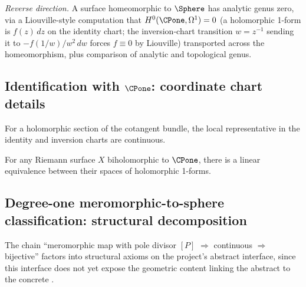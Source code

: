 \begin{formalizationnote}
\emph{Reverse direction.} A surface homeomorphic to \(\Sphere\) has analytic
genus zero, via a Liouville-style computation that
\(H^{0}(\CPone,\Omega^{1})=0\) (a holomorphic 1-form is \(f(z)\,dz\) on the
identity chart; the inversion-chart transition \(w=z^{-1}\) sending it to
\(-f(1/w)/w^{2}\,dw\) forces \(f\equiv0\) by Liouville) transported across the
homeomorphism, plus comparison of analytic and topological genus.
\end{formalizationnote}

\subsection{Identification with \(\CPone\): coordinate chart details}

\begin{lemma}
\label{lem:section-localRepr-continuity}
For a holomorphic section of the cotangent bundle, the local representative in the identity and inversion charts are continuous.
\leanok
\end{lemma}

\begin{theorem}
\label{lem:holomorphic-one-form-linearEquiv-to-OnePointCx}
For any Riemann surface \(X\) biholomorphic to \(\CPone\), there is a linear equivalence between their spaces of holomorphic 1-forms.
\leanok
\end{theorem}

\subsection{Degree-one meromorphic-to-sphere classification: structural decomposition}
\label{sec:degree-one-mer-decomp}

The chain ``meromorphic map with pole divisor \([P]\) \(\Rightarrow\)
continuous \(\Rightarrow\) bijective'' factors into structural axioms
on the project's abstract  interface,
since this interface does not yet expose the geometric content
linking the abstract  to the concrete .

